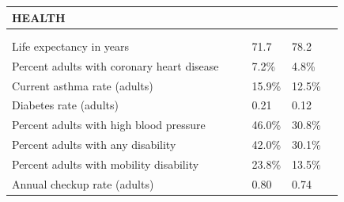 \documentclass[9pt]{report}
\begin{document}
\newpage
\setlength{\tabcolsep}{.01in} %
\begin{tabular}{p{.10in}p{.10in}p{.10in}p{3.7in}>{\hfill}p{.85in}>{\hfill}p{.85in}>{\hfill}p{.85in}>{\hfill}p{.85in}p{0.1in}}
\multicolumn{9}{l}{\parbox{7.1in}{\raggedright{\large{\strut\textbf{HEALTH}\strut}}}} \\ 
\hline
\multicolumn{4}{l}{\parbox{3.5in}{\raggedright{\textbf{}}}} & \multicolumn{1}{r}{\parbox{.85in}{\strut\raggedleft{\textbf{}\strut}}} & \multicolumn{1}{r}{\parbox{.85in}{\strut\raggedleft{\textbf{}\strut}}} & \multicolumn{1}{r}{\parbox{.85in}{\strut{}}} & \multicolumn{1}{r}{\parbox{.85in}{\strut{}}} & \\ 
\multicolumn{9}{l}{} \\ 
\multicolumn{4}{l}{\parbox{3.6in}{\strut\raggedright{{Life expectancy in years}}\strut}} &  &  & 71.7 & 78.2 & \multicolumn{1}{l}{}  \\ 
\multicolumn{4}{l}{\parbox{3.6in}{\strut\raggedright{{Percent adults with coronary heart disease}}\strut}} &  &  & 7.2\% & 4.8\% & \multicolumn{1}{l}{}  \\ 
\multicolumn{4}{l}{\parbox{3.6in}{\strut\raggedright{{Current asthma rate (adults)}}\strut}} &  &  & 15.9\% & 12.5\% & \multicolumn{1}{l}{}  \\ 
\multicolumn{4}{l}{\parbox{3.6in}{\strut\raggedright{{Diabetes rate (adults)}}\strut}} &  &  & 0.21 & 0.12 & \multicolumn{1}{l}{}  \\ 
\multicolumn{4}{l}{\parbox{3.6in}{\strut\raggedright{{Percent adults with high blood pressure}}\strut}} &  &  & 46.0\% & 30.8\% & \multicolumn{1}{l}{}  \\ 
\multicolumn{4}{l}{\parbox{3.6in}{\strut\raggedright{{Percent adults with any disability}}\strut}} &  &  & 42.0\% & 30.1\% & \multicolumn{1}{l}{}  \\ 
\multicolumn{4}{l}{\parbox{3.6in}{\strut\raggedright{{Percent adults with mobility disability}}\strut}} &  &  & 23.8\% & 13.5\% & \multicolumn{1}{l}{}  \\ 
\multicolumn{4}{l}{\parbox{3.6in}{\strut\raggedright{{Annual checkup rate (adults)}}\strut}} &  &  & 0.80 & 0.74 & \multicolumn{1}{l}{}  \\ 

\end{tabular}
\end{document}

